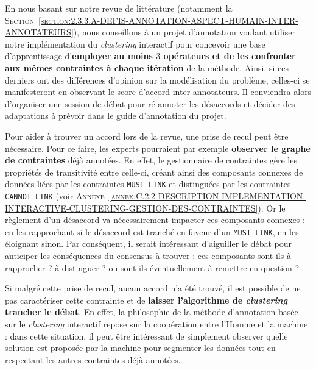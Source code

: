 			En nous basant sur notre revue de littérature (notamment la \textsc{Section~\ref{section:2.3.3.A-DEFIS-ANNOTATION-ASPECT-HUMAIN-INTER-ANNOTATEURS}}), nous conseillons à un projet d'annotation voulant utiliser notre implémentation du \textit{clustering} interactif pour concevoir une base d'apprentissage d'\textbf{employer au moins $3$ opérateurs et de les confronter aux mêmes contraintes à chaque itération} de la méthode.
			Ainsi, si ces derniers ont des différences d'opinion sur la modélisation du problème, celles-ci se manifesteront en observant le score d'accord inter-annotateurs.
			Il conviendra alors d'organiser une session de débat pour ré-annoter les désaccords et décider des adaptations à prévoir dans le guide d'annotation du projet.
			\begin{leftBarIdea}
				Pour aider à trouver un accord lors de la revue, une prise de recul peut être nécessaire.
				Pour ce faire, les experts pourraient par exemple \textbf{observer le graphe de contraintes} déjà annotées.
				En effet, le gestionnaire de contraintes gère les propriétés de transitivité entre celle-ci, créant ainsi des composants connexes de données liées par les contraintes \texttt{MUST-LINK} et distinguées par les contraintes \texttt{CANNOT-LINK} (voir \textsc{Annexe~\ref{annex:C.2.2-DESCRIPTION-IMPLEMENTATION-INTERACTIVE-CLUSTERING-GESTION-DES-CONTRAINTES}}).
				Or le règlement d'un désaccord va nécessairement impacter ces composants connexes : en les rapprochant si le désaccord est tranché en faveur d'un \texttt{MUST-LINK}, en les éloignant sinon.
				Par conséquent, il serait intéressant d'aiguiller le débat pour anticiper les conséquences du consensus à trouver : ces composants sont-ils à rapprocher ? à distinguer ? ou sont-ils 
				éventuellement à remettre en question ?

				Si malgré cette prise de recul, aucun accord n'a été trouvé, il est possible de ne pas caractériser cette contrainte et de \textbf{laisser l'algorithme de \textit{clustering} trancher le débat}.
				En effet, la philosophie de la méthode d'annotation basée sur le \textit{clustering} interactif repose sur la coopération entre l'Homme et la machine : dans cette situation, il peut être intéressant de simplement observer quelle solution est proposée par la machine pour segmenter les données tout en respectant les autres contraintes déjà annotées.
			\end{leftBarIdea}
			
